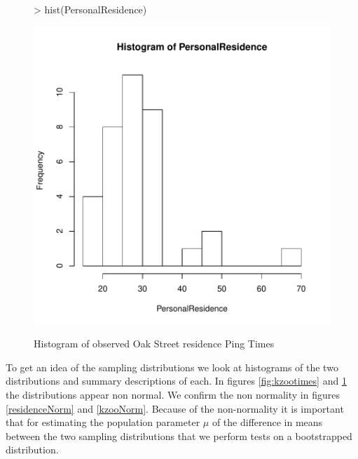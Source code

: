 \documentclass{article}
\begin{document}
\begin{figure}
\centering
\caption{Histogram of observed Oak Street residence Ping Times}
\begin{Schunk}
\begin{Sinput}
> hist(PersonalResidence)
\end{Sinput}
\end{Schunk}
\includegraphics{FinalProjectPingTimes-003}
\label{fig:personalresidencetimes}
\end{figure}
To get an idea of the sampling distributions we look at histograms of the two distributions and summary descriptions of each. In figures \ref{fig:kzootimes} and \ref{fig:personalresidencetimes} the distributions appear non normal. We confirm the non normality in figures \ref{residenceNorm} and \ref{kzooNorm}. Because of the non-normality it is important that for estimating the population parameter $\mu$ of the difference in means between the two sampling distributions that we perform tests on a bootstrapped distribution.
\end{document}
